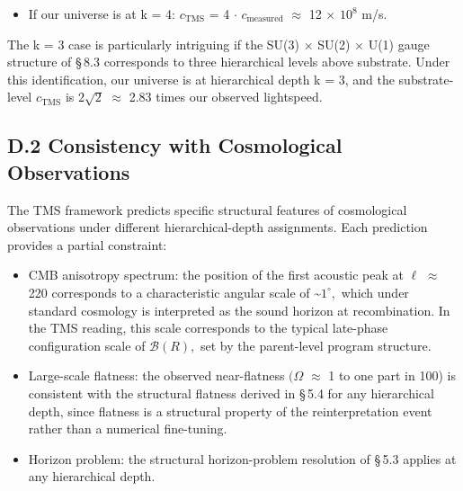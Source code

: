 \documentclass[11pt,oneside]{report}
\theoremstyle{definition}
\theoremstyle{remark}
\begin{document}
\begin{itemize}
\item
  If our universe is at k = 4: \ensuremath{c_{\mathrm{TMS}}} = 4 \ensuremath{\cdot} \ensuremath{c_{\mathrm{measured}}} \ensuremath{\approx} 12 \ensuremath{\times} \ensuremath{10^{8}} m/s.
\end{itemize}

The k = 3 case is particularly intriguing if the SU(3) \ensuremath{\times} SU(2) \ensuremath{\times} U(1)
gauge structure of \S\,8.3 corresponds to three hierarchical levels above
substrate. Under this identification, our universe is at hierarchical
depth k = 3, and the substrate-level \ensuremath{c_{\mathrm{TMS}}} is \ensuremath{2\sqrt{2}} \ensuremath{\approx} 2.83 times our
observed lightspeed.

\subsection*{D.2 Consistency with Cosmological Observations}

The TMS framework predicts specific structural features of cosmological
observations under different hierarchical-depth assignments. Each
prediction provides a partial constraint:

\begin{itemize}
\item
  CMB anisotropy spectrum: the position of the first acoustic peak at \ensuremath{\ell}
  \ensuremath{\approx} 220 corresponds to a characteristic angular scale of
  \textasciitilde\ensuremath{1^{\circ},} which under standard cosmology is interpreted as
  the sound horizon at recombination. In the TMS reading, this scale
  corresponds to the typical late-phase configuration scale of \ensuremath{\mathcal{B}(R),} set
  by the parent-level program structure.
\end{itemize}

\begin{itemize}
\item
  Large-scale flatness: the observed near-flatness \ensuremath{(\Omega} \ensuremath{\approx} 1 to one part in
  100) is consistent with the structural flatness derived in \S\,5.4 for
  any hierarchical depth, since flatness is a structural property of the
  reinterpretation event rather than a numerical fine-tuning.
\end{itemize}

\begin{itemize}
\item
  Horizon problem: the structural horizon-problem resolution of \S\,5.3
  applies at any hierarchical depth.
\end{itemize}
\end{document}
